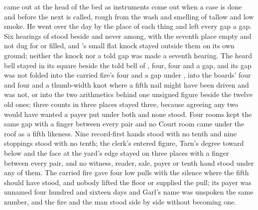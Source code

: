  came out at the head of the bed as instruments come out when a case is done and before the next is called, rough from the wash and smelling of tallow and low smoke. He went over the day by the place of each thing and left every gap a gap. Six hearings of  stood beside and never among, with the seventh place empty and not dug for or filled, and 's small flat knock stayed outside them on its own ground; neither the knock nor a told gap was made a seventh hearing. The heard bell stayed in its square beside the told bell of , four, four and a gap, and its gap was not folded into the carried fire's four and a gap under , into the boards' four and four and a thumb-width knot where a fifth nail might have been driven and was not, or into the two arithmetics behind one unsigned figure beside the twelve old ones; three counts in three places stayed three, because agreeing any two would have wanted a payer put under both and none stood. Four rooms kept the same gap with a finger between every pair and no Court room came under the roof as a fifth likeness. Nine record-first hands stood with no tenth and nine stoppings stood with no tenth; the clerk's entered figure, Tarn's degree toward  below  and the face at the yard's edge stayed on three places with a finger between every pair, and no witness, reader, sale, payer or tenth hand stood under any of them. The carried fire gave four low pulls with the silence where the fifth should have stood, and nobody lifted the floor or supplied the pull; its payer was unnamed four hundred and sixteen days and Garl's name was unspoken the same number, and the fire and the man stood side by side without becoming one.

